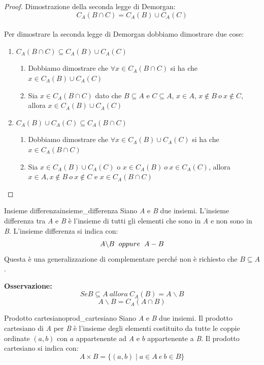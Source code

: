 \documentclass[12pt, letterpaper]{report}
\newcounter{definition}
\newcommand{\nmu}{}
\begin{document}
	\begin{proof}{Dimostrazione della seconda legge di Demorgan: \[
			C_A(B \cap C) = C_A(B) \cup C_A(C)
			\]}	 \quad \\
		Per dimostrare la seconda legge di Demorgan dobbiamo dimostrare due cose:
		\begin{enumerate}
			\item $C_{A}(B \cap C) \subseteq C_{A}(B) \cup C_{A}(C)$
				\begin{enumerate}
					\item Dobbiamo dimostrare che $\forall x \in C_{A}(B \cap C)$ si ha che $x \in C_{A}(B) \cup C_{A}(C)$
					\item Sia $x \in C_{A}(B \cap C)$ dato che $B \subseteq A$ e $C \subseteq A$, $x \in A$, $x \notin B \ o \ x \notin C$, allora $x \in C_{A}(B) \cup C_{A}(C)$
				\end{enumerate}
			\item $C_{A}(B) \cup C_{A}(C) \subseteq C_{A}(B \cap C)$
				\begin{enumerate}
					\item Dobbiamo dimostrare che $\forall x \in C_{A}(B) \cup C_{A}(C)$ si ha che $x \in C_{A}(B \cap C)$
					\item Sia $x \in C_{A}(B) \cup C_{A}(C)$ o $x \in C_{A}(B) \ o \ x \in C_{A}(C)$, allora $x \in A, x \notin B \ o \ x \notin C$ e $x \in C_{A}(B \cap C)$

				\end{enumerate}
		\end{enumerate}

	\end{proof}
	\begin{definition}{\nmu Insieme differenza}{insieme_differenza}
		Siano \textit{A} e \textit{B} due insiemi. L'insieme differenza tra \textit{A} e \textit{B} è l'insieme di tutti gli elementi che sono in \textit{A} e non sono in \textit{B}.
		L'insieme differenza si indica con:
		\[
			A \backslash B \hspace{0.2cm} oppure \hspace{0.2cm} A - B
		\]
		Questa è una generalizzazione di complementare perché non è richiesto che $B \subseteq A$.
	\end{definition}
	\newpage
	\textbf{Osservazione: }
	\[
		Se B \subseteq A \ allora \ C_{A}(B) = A \backslash B
	\]
	\[
		A \backslash B = C_{A}(A \cap B)
	\]
	\begin{definition}{\nmu Prodotto cartesiano}{prod_cartesiano}
		Siano \textit{A} e \textit{B} due insiemi. Il prodotto cartesiano di \textit{A} per \textit{B} è l'insieme degli elementi costituito da tutte le coppie ordinate $(a, b)$ con $a$ appartenente ad \textit{A} e $b$ appartenente a \textit{B}.
		Il prodotto cartesiano si indica con:
		\[
		A \times B = \{(a, b) \mid a \in A \ e \ b \in B\}
		\]
	\end{definition}
\end{document}
